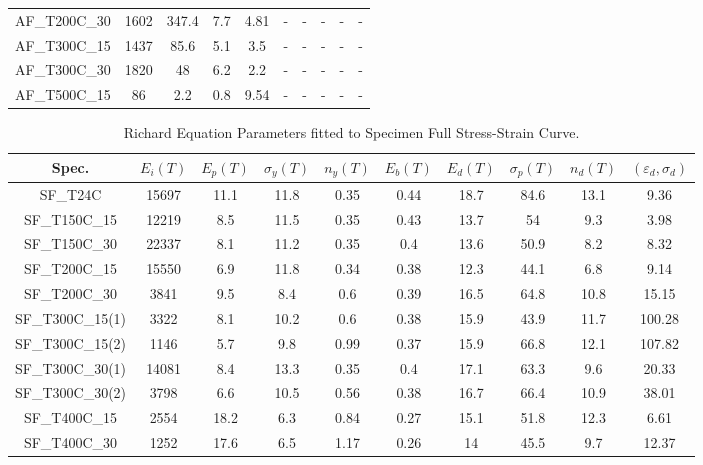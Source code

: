 \documentclass[review]{elsarticle}
\begin{document}
{\begin{landscape}
\begin{table}[htbp]
\begin{tabular}{cccccccccc}
		AF\_T200C\_30 & 1602  & 347.4 & 7.7   & 4.81  & -     & -     & -     & -     & - \\
		AF\_T300C\_15 & 1437  & 85.6  & 5.1   & 3.5   & -     & -     & -     & -     & - \\
		AF\_T300C\_30 & 1820  & 48    & 6.2   & 2.2   & -     & -     & -     & -     & - \\
		AF\_T500C\_15 & 86    & 2.2   & 0.8   & 9.54  & -     & -     & -     & -     & - \\
		\bottomrule
	\end{tabular}%
	\label{Tab3}%
\end{table}%


\begin{table}[htbp]
	\centering
	\caption{Richard Equation Parameters fitted to Specimen Full Stress-Strain Curve.}
	\begin{tabular}{cccccccccc}
		\toprule
		Spec. &  $E_i(T)$     &    $E_p(T)$   &   $\sigma_y(T)$    &   $n_y(T)$    &     $E_b(T)$   &    $E_d(T)$   &   $\sigma_p(T)$    &   $n_d(T)$    &  $(\varepsilon_d,\sigma_d)$\\
		\midrule
		SF\_T24C & 15697 & 11.1  & 11.8  & 0.35  & 0.44  & 18.7  & 84.6  & 13.1  & 9.36 \\
		SF\_T150C\_15 & 12219 & 8.5   & 11.5  & 0.35  & 0.43  & 13.7  & 54    & 9.3   & 3.98 \\
		SF\_T150C\_30 & 22337 & 8.1   & 11.2  & 0.35  & 0.4   & 13.6  & 50.9  & 8.2   & 8.32 \\
		SF\_T200C\_15 & 15550 & 6.9   & 11.8  & 0.34  & 0.38  & 12.3  & 44.1  & 6.8   & 9.14 \\
		SF\_T200C\_30 & 3841  & 9.5   & 8.4   & 0.6   & 0.39  & 16.5  & 64.8  & 10.8  & 15.15 \\
		SF\_T300C\_15(1) & 3322  & 8.1   & 10.2  & 0.6   & 0.38  & 15.9  & 43.9  & 11.7  & 100.28 \\
		SF\_T300C\_15(2) & 1146  & 5.7   & 9.8   & 0.99  & 0.37  & 15.9  & 66.8  & 12.1  & 107.82 \\
		SF\_T300C\_30(1) & 14081 & 8.4   & 13.3  & 0.35  & 0.4   & 17.1  & 63.3  & 9.6   & 20.33 \\
		SF\_T300C\_30(2) & 3798  & 6.6   & 10.5  & 0.56  & 0.38  & 16.7  & 66.4  & 10.9  & 38.01 \\
		SF\_T400C\_15 & 2554  & 18.2  & 6.3   & 0.84  & 0.27  & 15.1  & 51.8  & 12.3  & 6.61 \\
		SF\_T400C\_30 & 1252  & 17.6  & 6.5   & 1.17  & 0.26  & 14    & 45.5  & 9.7   & 12.37 \\

\end{tabular}
\end{table}
\end{landscape}}
\end{document}
